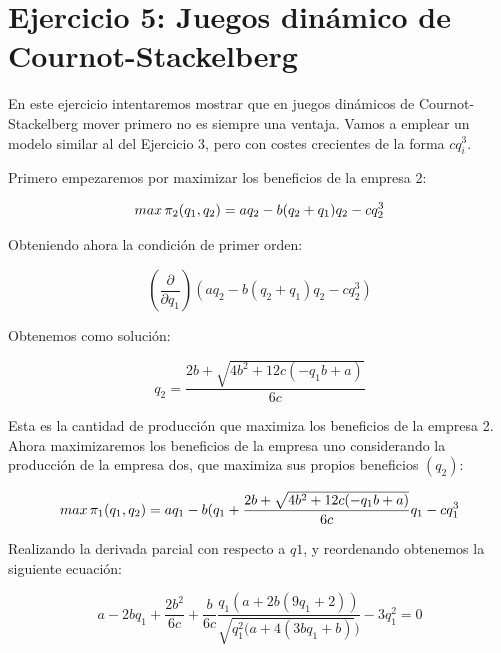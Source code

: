 \documentclass{article}
\begin{document}
\section{Ejercicio 5: Juegos din\'amico de Cournot-Stackelberg}

En este ejercicio intentaremos mostrar que en juegos dinámicos de Cournot-Stackelberg mover primero no es siempre una ventaja. Vamos a emplear un modelo similar al del Ejercicio 3, pero con costes crecientes de la forma $cq_i^3$.

\vspace{5mm}

Primero empezaremos por maximizar los beneficios de la empresa 2:

$$max\thinspace \pi_2(q_1,q_2)=aq_2-b(q_2+q_1)q_2-cq^3_2$$

Obteniendo ahora la condici\'on de primer orden:

$$(\frac{\partial}{\partial q_1})(aq_2-b(q_2+q_1)q_2-cq^3_2)$$

Obtenemos como soluci\'on:

$$q_2=\frac{2b+\sqrt{4b^2+12c(-q_1b+a)}}{6c}$$

Esta es la cantidad de producci\'on que maximiza los beneficios de la empresa 2. Ahora maximizaremos los beneficios de la empresa uno considerando la producci\'on de la empresa dos, que maximiza sus propios beneficios $(q_2)$:

$$max\thinspace \pi_1(q_1,q_2)=aq_1-b(q_1+\frac{2b+\sqrt{4b^2+12c(-q_1b+a)}}{6c}q_1-cq^3_1$$

Realizando la derivada parcial con respecto a $q1$, y reordenando obtenemos la siguiente ecuación:

$$a-2bq_1+\frac{2b^2}{6c}+\frac{b}{6c}\frac{q_1(a+2b(9q_1+2))}{\sqrt{q_1^2(a+4(3bq_1+b)})}-3q_1^2=0$$
\end{document}
